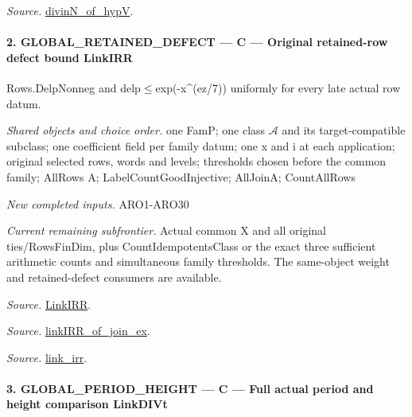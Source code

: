 \documentclass[11pt,a4paper]{article}
\numberwithin{equation}{section}
\theoremstyle{remark}\newtheorem{remark}[theorem]{Remark}
\begin{document}
\emph{Source.} \href{https://github.com/CocoSgt/riemann-hypothesis-lean/blob/7cbf7a0c32fca1badf05931879a37c3f8a2b03b4/src/Development/AutomorphicArithmetic/CharacterBoxes/DivinNOfHypV.lean#L117-L134}{divinN\_\allowbreak of\_\allowbreak hypV}.



\paragraph{2. GLOBAL\_\allowbreak RETAINED\_\allowbreak DEFECT — C — Original retained-row defect bound LinkIRR}

Rows.DelpNonneg and delp$\le$exp(-x\textasciicircum{}(ez/7)) uniformly for every late actual row datum.

\emph{Shared objects and choice order.} one FamP; one class $\mathcal A$ and its target-compatible subclass; one coefficient field per family datum; one x and i at each application; original selected rows, words and levels; thresholds chosen before the common family; AllRows A; LabelCountGoodInjective; AllJoinA; CountAllRows

\emph{New completed inputs.} ARO1-ARO30

\emph{Current remaining subfrontier.} Actual common X and all original ties/RowsFinDim, plus CountIdempotentsClass or the exact three sufficient arithmetic counts and simultaneous family thresholds. The same-object weight and retained-defect consumers are available.

\emph{Source.} \href{https://github.com/CocoSgt/riemann-hypothesis-lean/blob/7cbf7a0c32fca1badf05931879a37c3f8a2b03b4/src/Formalism/SharpRestriction/GlobalTheoremInputs.lean#L55-L58}{LinkIRR}.

\emph{Source.} \href{https://github.com/CocoSgt/riemann-hypothesis-lean/blob/7cbf7a0c32fca1badf05931879a37c3f8a2b03b4/src/Development/AbelianVarietyTheory/Proofs/GlobalInterpolation/LinkIRROfJoinEx.lean#L17-L38}{linkIRR\_\allowbreak of\_\allowbreak join\_\allowbreak ex}.

\emph{Source.} \href{https://github.com/CocoSgt/riemann-hypothesis-lean/blob/7cbf7a0c32fca1badf05931879a37c3f8a2b03b4/src/Development/AbelianVarietyTheory/Proofs/GlobalInterpolation/LinkIRROfJoinEx.lean#L143-L166}{link\_\allowbreak irr}.



\paragraph{3. GLOBAL\_\allowbreak PERIOD\_\allowbreak HEIGHT — C — Full actual period and height comparison LinkDIVt}
\end{document}
